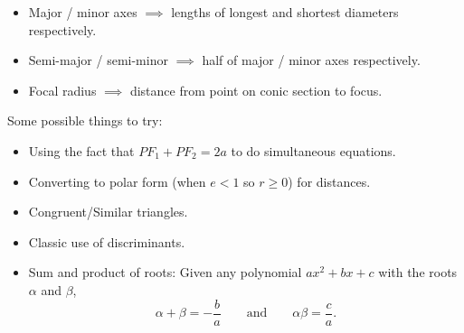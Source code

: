 \documentclass[oneside]{book}
\begin{document}
  \begin{definition*}{}{}
    \begin{itemize}[label=\(\circ\)]
      \item Major / minor axes \(\implies\) lengths of longest and shortest diameters respectively.
      \item Semi-major / semi-minor \(\implies\) half of major / minor axes respectively.
      \item Focal radius \(\implies\) distance from point on conic section to focus.
    \end{itemize}
  \end{definition*}
  \begin{note}
    Some possible things to try:
    \begin{itemize}
      \item Using the fact that \(PF_1+PF_2=2a\) to do simultaneous equations.
      \item Converting to polar form (when \(e<1\) so \(r \geq 0\)) for distances.
      \item Congruent/Similar triangles.
      \item Classic use of discriminants.
      \item Sum and product of roots: Given any polynomial \(ax^2+bx+c\) with the roots \(\alpha\) and \(\beta\),
      \[\alpha + \beta = - \frac{b}{a} \qquad\text{and}\qquad \alpha\beta=\frac{c}{a}.\]
    \end{itemize}
  \end{note}
\end{document}
